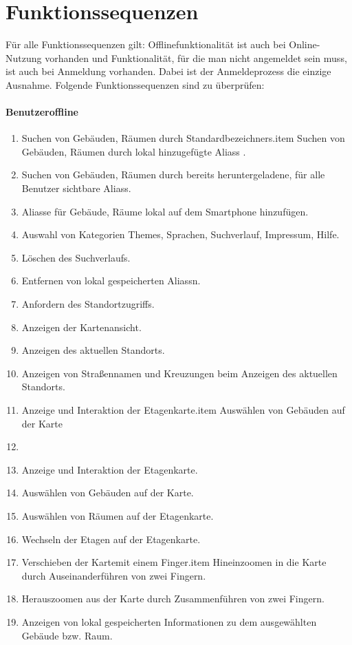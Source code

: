 \section{Funktionssequenzen}

Für alle Funktionssequenzen gilt:
Offlinefunktionalität ist auch bei Online-Nutzung vorhanden und Funktionalität, für die man nicht angemeldet sein muss, ist auch bei Anmeldung vorhanden. Dabei ist der Anmeldeprozess die einzige Ausnahme.
Folgende Funktionssequenzen sind zu überprüfen:

\paragraph{\Gls{Benutzer}offline}
\begin{enumerate}[label=\textbf{/T\arabic*0/}, align=left]
	\item Suchen von Gebäuden, Räumen durch \Glspl{Standardbezeichner}.item Suchen von Gebäuden, Räumen durch lokal hinzugefügte \Glspl{Alias} .
	\item Suchen von Gebäuden, Räumen durch bereits heruntergeladene, für alle Benutzer sichtbare \Glspl{Alias}.
	\item Aliasse für Gebäude, Räume lokal auf dem Smartphone hinzufügen.
	\item Auswahl von Kategorien Themes, Sprachen, Suchverlauf, Impressum, Hilfe.
	\item Löschen des Suchverlaufs.
	\item Entfernen von lokal gespeicherten \Glspl{Alias}n.
	\item Anfordern des Standortzugriffs.
	\item Anzeigen der \Gls{Kartenansicht}.
	\item Anzeigen des aktuellen Standorts.
	\item Anzeigen von Straßennamen und Kreuzungen beim Anzeigen des aktuellen Standorts.
	\item Anzeige und Interaktion der \Gls{Etagenkarte}.item Auswählen von Gebäuden auf der \Gls{Karte}
	\item \item Anzeige und Interaktion der \Gls{Etagenkarte}.
	\item Auswählen von Gebäuden auf der \Gls{Karte}.
	\item Auswählen von Räumen auf der \Gls{Etagenkarte}.
	\item Wechseln der Etagen auf der \Gls{Etagenkarte}.
	\item Verschieben der \Gls{Karte}mit einem Finger.item Hineinzoomen in die \Gls{Karte} durch Auseinanderführen von zwei Fingern.
	\item Herauszoomen aus der \Gls{Karte} 
		durch Zusammenführen von zwei Fingern.
	\item Anzeigen von lokal gespeicherten Informationen zu dem ausgewählten Gebäude bzw. Raum.
\end{enumerate}

